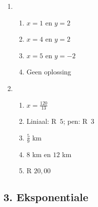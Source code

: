 {\begin{multicols}{3}
\begin{enumerate}[noitemsep, label=\textbf{\arabic*}. ]
\item %
\begin{enumerate}[noitemsep,label=\textbf{(\alph*)}]
\item $x=1$ en $y=2$%
\item $x=4$ en $y=2$%
\item $x=5$ en $y=-2$%
\item Geen oplossing%
\end{enumerate}

\item %
\begin{enumerate}[noitemsep,label=\textbf{(\alph*)}]
\item $x=\frac{120}{13}$%
\item Liniaal: R~$5$; pen: R~$3$%
\item $\frac{5}{9}$ km%
\item $8$ km en $12$ km%
\item R $20,00$%
   

\end{enumerate}
\end{enumerate}

\end{multicols}

\subsection*{3. Eksponentiale}
\begin{multicols}{3}

\end{multicols}}
